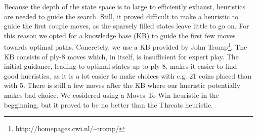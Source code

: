 Because the depth of the state space is to large to efficiently exhaust,
heuristics are needed to guide the search. Still, it proved difficult to make a
heuristic to guide the first couple moves, as the sparsely filled states leave
little to go on. For this reason we opted for a knowledge base (KB) to guide the
first few moves towards optimal paths. Concretely, we use a KB provided by John
Tromp\footnote{http://homepages.cwi.nl/\textasciitilde tromp/}. The KB consists
of ply-8 moves which, in itself, is insufficient for expert play. The initial
guidance, leading to optimal states up to ply-8, makes it easier to find good
hueristics, as it is a lot easier to make choices with e.g. 21 coins placed than
with 5. There is still a few moves after the KB where our hueristic potentially
makes bad choice. We cosidered using a Moves To Win heuristic in the begginning,
but it proved to be no better than the Threats heuristic.
